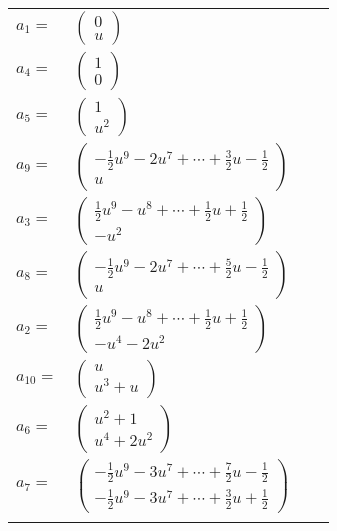 \documentclass[1p]{elsarticle_modified}
\theoremstyle{definition}
\begin{document}
\begin{tabular}{m{7pt} m{180pt} m{7pt} m{180pt} }
\flushright $a_{1}=$&$\begin{pmatrix}0\\u\end{pmatrix}$ \\
\flushright $a_{4}=$&$\begin{pmatrix}1\\0\end{pmatrix}$ \\
\flushright $a_{5}=$&$\begin{pmatrix}1\\u^2\end{pmatrix}$ \\
\flushright $a_{9}=$&$\begin{pmatrix}-\frac{1}{2} u^9-2 u^7+\cdots+\frac{3}{2} u-\frac{1}{2}\\u\end{pmatrix}$ \\
\flushright $a_{3}=$&$\begin{pmatrix}\frac{1}{2} u^9- u^8+\cdots+\frac{1}{2} u+\frac{1}{2}\\- u^2\end{pmatrix}$ \\
\flushright $a_{8}=$&$\begin{pmatrix}-\frac{1}{2} u^9-2 u^7+\cdots+\frac{5}{2} u-\frac{1}{2}\\u\end{pmatrix}$ \\
\flushright $a_{2}=$&$\begin{pmatrix}\frac{1}{2} u^9- u^8+\cdots+\frac{1}{2} u+\frac{1}{2}\\- u^4-2 u^2\end{pmatrix}$ \\
\flushright $a_{10}=$&$\begin{pmatrix}u\\u^3+u\end{pmatrix}$ \\
\flushright $a_{6}=$&$\begin{pmatrix}u^2+1\\u^4+2 u^2\end{pmatrix}$ \\
\flushright $a_{7}=$&$\begin{pmatrix}-\frac{1}{2} u^9-3 u^7+\cdots+\frac{7}{2} u-\frac{1}{2}\\-\frac{1}{2} u^9-3 u^7+\cdots+\frac{3}{2} u+\frac{1}{2}\end{pmatrix}$\\&\end{tabular}
\end{document}
